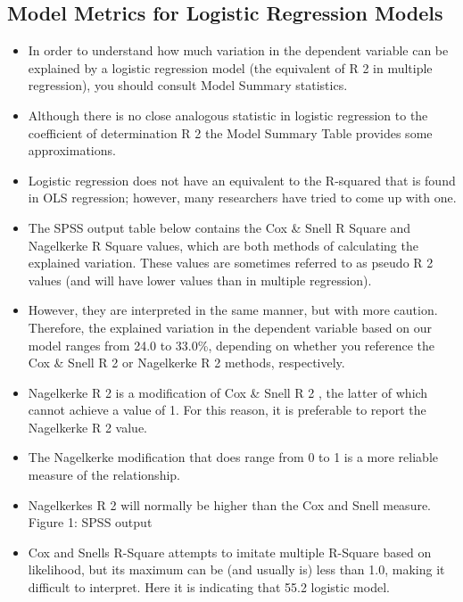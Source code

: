 \documentclass[a4paper,12pt]{article}
\begin{document}
\subsection{Model Metrics for Logistic Regression Models}
\begin{itemize}
\item In order to understand how much variation in the dependent variable can be explained
by a logistic regression model (the equivalent of R 2 in multiple regression), you should
consult Model Summary statistics.
\item Although there is no close analogous statistic in logistic regression to the coefficient of
determination R 2 the Model Summary Table provides some approximations.
\item Logistic regression does not have an equivalent to the R-squared that is found in OLS
regression; however, many researchers have tried to come up with one.
\item The SPSS output table below contains the Cox \& Snell R Square and Nagelkerke R Square
values, which are both methods of calculating the explained variation. These values are
sometimes referred to as pseudo R 2 values (and will have lower values than in multiple
regression).
\item However, they are interpreted in the same manner, but with more caution. Therefore,
the explained variation in the dependent variable based on our model ranges from 24.0%
to 33.0\%, depending on whether you reference the Cox \& Snell R 2 or Nagelkerke R 2
methods, respectively.
\item Nagelkerke R 2 is a modification of Cox \& Snell R 2 , the latter of which cannot achieve a
value of 1. For this reason, it is preferable to report the Nagelkerke R 2 value.
\item The Nagelkerke modification that does range from 0 to 1 is a more reliable measure of
the relationship.
\item Nagelkerkes R 2 will normally be higher than the Cox and Snell measure.
Figure 1: SPSS output
\item Cox and Snells R-Square attempts to imitate multiple R-Square based on likelihood, but
its maximum can be (and usually is) less than 1.0, making it difficult to interpret. Here
it is indicating that 55.2%
logistic model.
\end{itemize}

\end{document}
